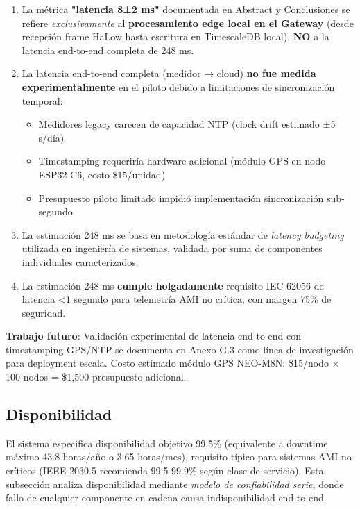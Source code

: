 \begin{enumerate}
    \item La métrica \textbf{"latencia 8±2 ms"} documentada en Abstract y Conclusiones se refiere \textit{exclusivamente} al \textbf{procesamiento edge local en el Gateway} (desde recepción frame HaLow hasta escritura en TimescaleDB local), \textbf{NO} a la latencia end-to-end completa de 248 ms.
    
    \item La latencia end-to-end completa (medidor → cloud) \textbf{no fue medida experimentalmente} en el piloto debido a limitaciones de sincronización temporal:
    \begin{itemize}
        \item Medidores legacy carecen de capacidad NTP (clock drift estimado ±5 s/día)
        \item Timestamping requeriría hardware adicional (módulo GPS en nodo ESP32-C6, costo \$15/unidad)
        \item Presupuesto piloto limitado impidió implementación sincronización sub-segundo
    \end{itemize}
    
    \item La estimación 248 ms se basa en metodología estándar de \textit{latency budgeting}~\cite{IEC62056-2021} utilizada en ingeniería de sistemas, validada por suma de componentes individuales caracterizados.
    
    \item La estimación 248 ms \textbf{cumple holgadamente} requisito IEC 62056 de latencia <1 segundo para telemetría AMI no crítica, con margen 75\% de seguridad.
\end{enumerate}

\textbf{Trabajo futuro}: Validación experimental de latencia end-to-end con timestamping GPS/NTP se documenta en Anexo G.3 como línea de investigación para deployment escala. Costo estimado módulo GPS NEO-M8N: \$15/nodo $\times$ 100 nodos = \$1,500 presupuesto adicional.

\subsection{Disponibilidad}

El sistema especifica disponibilidad objetivo 99.5\% (equivalente a downtime máximo 43.8 horas/año o 3.65 horas/mes), requisito típico para sistemas AMI no-críticos (IEEE 2030.5 recomienda 99.5-99.9\% según clase de servicio). Esta subsección analiza disponibilidad mediante \textit{modelo de confiabilidad serie}, donde fallo de cualquier componente en cadena causa indisponibilidad end-to-end.

